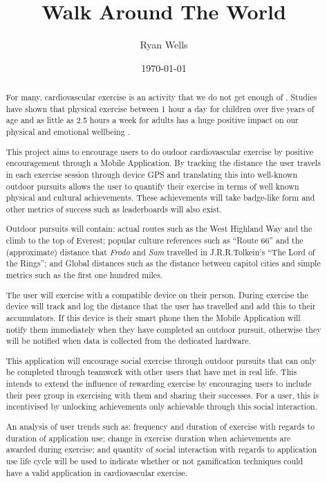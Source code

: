\documentclass{l3proj}
\begin{document}
\newcommand{\todo}[1]{\textcolor{red}{#1}}
	
	
\title{Walk Around The World}
\author{Ryan Wells}
\date{\today}
\maketitle
\begin{abstract}
For many, cardiovascular exercise is an activity that we do not get
enough of\cite{exercise} . Studies have shown that physical exercise
between 1 hour a day for children over five years of age and as
little as 2.5 hours a week for adults has a huge positive impact on
our physical and emotional wellbeing\cite{govsurvey, amsurvey} .

This project aims to encourage users to do oudoor
cardiovascular exercise by positive encouragement through a Mobile
Application. By tracking the distance the user travels in each
exercise session through device GPS and translating this into
well-known outdoor pursuits allows the user to quantify their exercise
in terms of well known physical and cultural achievements. These
achievements will take badge-like form and other metrics of success
such as leaderboards will also exist. 

Outdoor pursuits will contain: actual routes such as the West Highland
Way and the climb to the top of Everest; popular culture references
such as ``Route 66'' and the (approximate) distance that \emph{Frodo}
and \emph{Sam} travelled in J.R.R.Tolkein's ``The Lord of the Rings'';
and Global distances such as the distance between capitol cities and
simple metrics such as the first one hundred miles. 

The user will exercise with a compatible device on their
person. During exercise the device will track and log the distance
that the user has travelled and add this to their accumulators. If
this device is their smart phone then the Mobile Application will
notify them immediately when they have completed an outdoor pursuit,
otherwise they will be notified when data is collected from the
dedicated hardware.

This application will encourage social exercise through outdoor
pursuits that can only be completed through teamwork with other users
that have met in real life. This intends to extend the influence of
rewarding exercise by encouraging users to include their peer group in
exercising with them and sharing their successes. For a user,
this is incentivised by unlocking achievements only achievable through
this social interaction.

An analysis of user trends such as: frequency and duration of exercise
with regards to duration of application use; change in exercise
duration when achievements are awarded during exercise; and quantity of
social interaction with regards to application use life cycle will be
used to indicate whether or not gamification techniques could have a
valid application in cardiovascular exercise. 

\end{abstract}
\tableofcontents





\end{document}
